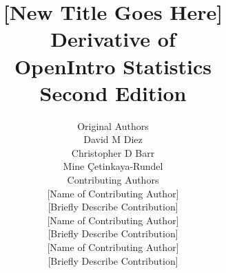 

\title{\huge [New Title Goes Here] \\[2mm]
\large Derivative of \\
OpenIntro Statistics \\
Second Edition}
\author{\Large Original Authors \\[1.5mm]
\normalsize David M Diez \\
\normalsize Christopher D Barr \\
\normalsize Mine \c{C}etinkaya-Rundel \\[8mm]
\Large Contributing Authors \\[1.5mm]
\normalsize [Name of Contributing Author] \\
\small [Briefly Describe Contribution] \\[2mm]
\normalsize [Name of Contributing Author] \\
\small [Briefly Describe Contribution] \\[2mm]
\normalsize [Name of Contributing Author] \\
\small [Briefly Describe Contribution] \\[2mm]
}

